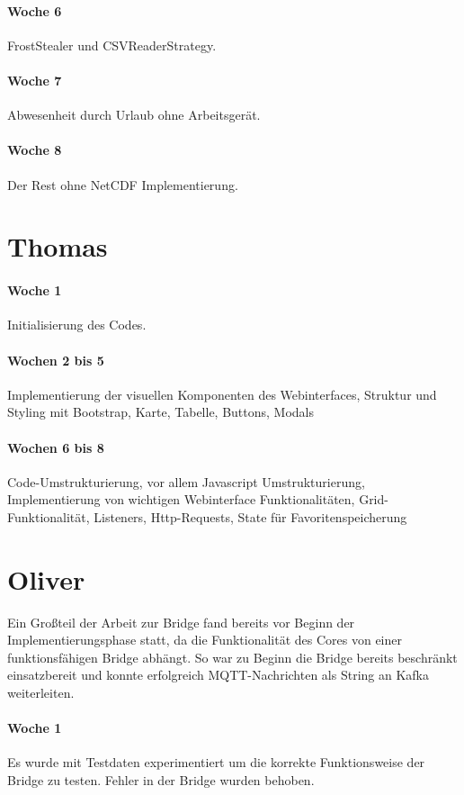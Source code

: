 \paragraph{Woche 6}
FrostStealer und CSVReaderStrategy.
\paragraph{Woche 7}
Abwesenheit durch Urlaub ohne Arbeitsgerät.
\paragraph{Woche 8}
Der Rest ohne NetCDF Implementierung.

\section{Thomas}
\paragraph{Woche 1}
Initialisierung des Codes.
\paragraph{Wochen 2 bis 5}
Implementierung der visuellen Komponenten des Webinterfaces, Struktur und Styling mit Bootstrap, Karte, Tabelle, Buttons, Modals
\paragraph{Wochen 6 bis 8}
Code-Umstrukturierung, vor allem Javascript Umstrukturierung,
Implementierung von wichtigen Webinterface Funktionalitäten, Grid-Funktionalität, Listeners, Http-Requests, State für Favoritenspeicherung

\newpage
\section{Oliver}
Ein Großteil der Arbeit zur Bridge fand bereits vor Beginn der Implementierungsphase statt, da die Funktionalität des Cores von einer funktionsfähigen Bridge abhängt. So war zu Beginn die Bridge bereits beschränkt einsatzbereit und konnte erfolgreich MQTT-Nachrichten als String an Kafka weiterleiten.
\paragraph{Woche 1}
Es wurde mit Testdaten experimentiert um die korrekte Funktionsweise der Bridge zu testen. Fehler in der Bridge wurden behoben.
